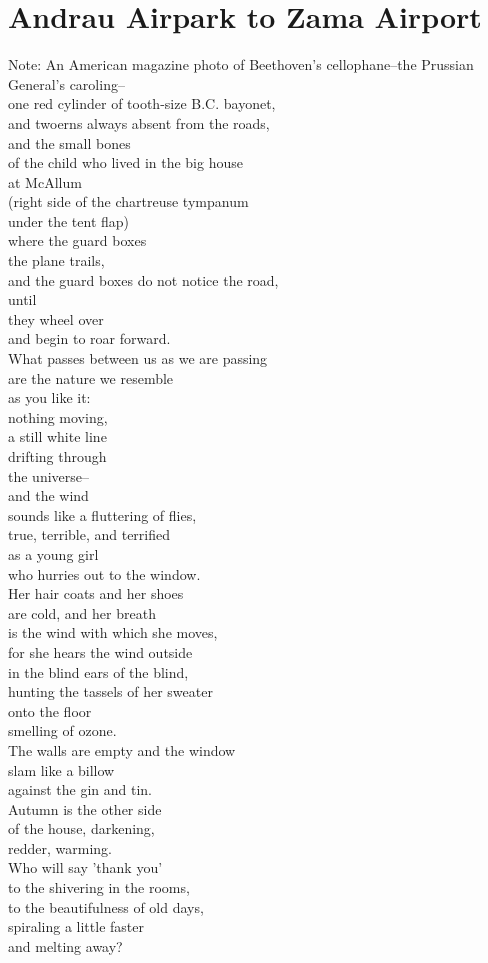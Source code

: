 \documentclass[smalldemyvopaper,11pt,twoside,onecolumn,openright,extrafontsizes]{memoir}
\begin{document}
\chapter{Andrau Airpark to Zama Airport}
Note: An American magazine photo of Beethoven's cellophane--the Prussian General's caroling--
\\one red cylinder of tooth-size B.C. bayonet,
\\and twoerns always absent from the roads,
\\and the small bones
\\of the child who lived in the big house
\\at McAllum
\\(right side of the chartreuse tympanum
\\under the tent flap)
\\where the guard boxes
\\the plane trails,
\\and the guard boxes do not notice the road,
\\until
\\they wheel over
\\and begin to roar forward.
\\What passes between us as we are passing
\\are the nature we resemble
\\as you like it:
\\nothing moving,
\\a still white line
\\drifting through
\\the universe--
\\and the wind
\\sounds like a fluttering of flies,
\\true, terrible, and terrified
\\as a young girl
\\who hurries out to the window.
\\Her hair coats and her shoes
\\are cold, and her breath
\\is the wind with which she moves,
\\for she hears the wind outside
\\in the blind ears of the blind,
\\hunting the tassels of her sweater
\\onto the floor
\\smelling of ozone.
\\The walls are empty and the window
\\slam like a billow
\\against the gin and tin.
\\Autumn is the other side
\\of the house, darkening,
\\redder, warming.
\\Who will say 'thank you'
\\to the shivering in the rooms,
\\to the beautifulness of old days,
\\spiraling a little faster
\\and melting away?
\end{document}
